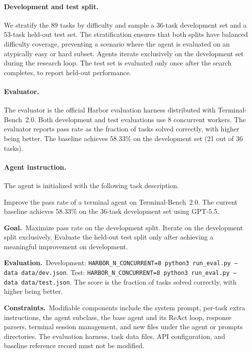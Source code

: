 \paragraph{Development and test split.}
We stratify the 89 tasks by difficulty and sample a 36-task development
set and a 53-task held-out test set.
The stratification ensures that both splits have balanced difficulty
coverage, preventing a scenario where the agent is evaluated on an
atypically easy or hard subset.
Agents iterate exclusively on the development set during the research
loop.
The test set is evaluated only once after the search completes, to
report held-out performance.

\paragraph{Evaluator.}
The evaluator is the official Harbor evaluation harness distributed with
Terminal-Bench~2.0.
Both development and test evaluations use 8 concurrent workers.
The evaluator reports pass rate as the fraction of tasks solved correctly,
with higher being better.
The baseline achieves 58.33\% on the development set (21 out of 36 tasks).

\paragraph{Agent instruction.}
The agent is initialized with the following task description.

\begin{promptbox}[title=\textbf{Terminal-Bench 2.0 Task Instruction}]
Improve the pass rate of a terminal agent on Terminal-Bench~2.0.
The current baseline achieves 58.33\% on the 36-task development set
using GPT-5.5.

\smallskip
\noindent\textbf{Goal.}~Maximize pass rate on the development split.
Iterate on the development split exclusively.
Evaluate the held-out test split only after achieving a meaningful
improvement on development.

\smallskip
\noindent\textbf{Evaluation.}~Development: \texttt{HARBOR\_N\_CONCURRENT=8 python3 run\_eval.py --data data/dev.json}.
Test: \texttt{HARBOR\_N\_CONCURRENT=8 python3 run\_eval.py --data data/test.json}.
The score is the fraction of tasks solved correctly, with higher being better.

\smallskip
\noindent\textbf{Constraints.}~Modifiable components include the system
prompt, per-task extra instructions, the agent subclass, the base agent
and its ReAct loop, response parsers, terminal session management, and
new files under the agent or prompts directories.
The evaluation harness, task data files, API configuration, and baseline
reference record must not be modified.
\end{promptbox}

